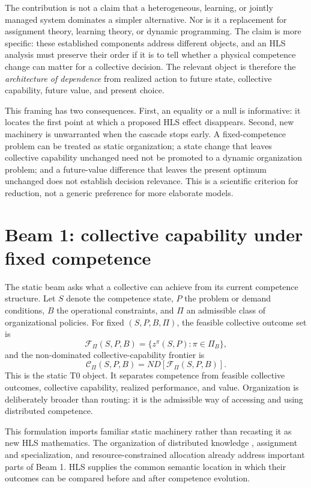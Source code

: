 \documentclass[10pt]{article}
\newcommand{\Ccap}{\mathcal{C}}
\newcommand{\Fset}{\mathcal{F}}
\begin{document}
The contribution is not a claim that a heterogeneous, learning, or jointly
managed system dominates a simpler alternative. Nor is it a replacement for
assignment theory, learning theory, or dynamic programming. The claim is more
specific: these established components address different objects, and an HLS
analysis must preserve their order if it is to tell whether a physical
competence change can matter for a collective decision. The relevant object is
therefore the \emph{architecture of dependence} from realized action to future
state, collective capability, future value, and present choice.

This framing has two consequences. First, an equality or a null is informative:
it locates the first point at which a proposed HLS effect disappears. Second,
new machinery is unwarranted when the cascade stops early. A fixed-competence
problem can be treated as static organization; a state change that leaves
collective capability unchanged need not be promoted to a dynamic organization
problem; and a future-value difference that leaves the present optimum
unchanged does not establish decision relevance. This is a scientific criterion
for reduction, not a generic preference for more elaborate models.

\section{Beam 1: collective capability under fixed competence}

The static beam asks what a collective can achieve from its current competence
structure. Let $S$ denote the competence state, $P$ the problem or demand
conditions, $B$ the operational constraints, and $\Pi$ an admissible class of
organizational policies. For fixed $(S,P,B,\Pi)$, the feasible collective
outcome set is
\begin{equation}
\Fset_{\Pi}(S,P,B)=\{z^\pi(S,P):\pi\in\Pi_B\},
\end{equation}
and the non-dominated collective-capability frontier is
\begin{equation}
\Ccap_{\Pi}(S,P,B)=ND[\Fset_{\Pi}(S,P,B)].
\label{eq:t0}
\end{equation}
This is the static T0 object. It separates competence from feasible collective
outcomes, collective capability, realized performance, and value. Organization
is deliberately broader than routing: it is the admissible way of accessing
and using distributed competence.

This formulation imports familiar static machinery rather than recasting it as
new HLS mathematics. The organization of distributed knowledge
\citep{garicano2000}, assignment and specialization, and resource-constrained
allocation already address important parts of Beam 1. HLS supplies the common
semantic location in which their outcomes can be compared before and after
competence evolution.
\end{document}
